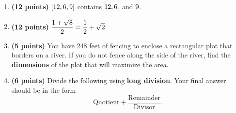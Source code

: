 \documentclass[12pt]{amsart}
\begin{document}
\begin{enumerate}
\item {\bf (12 points)} 
 $\setthreetwo$ contains $\athreetwo,\bthreetwo$, and $\cthreetwo$. 
\vfill 
\def \a{7}\def \atwoone{1}\def \atwotwo{-2}\def \atwothree{2}\def \btwothree{8}\def \sumtwothree{10}\def \diftwothree{-6}\def \bigtwothree{200}\def \powtwothree{64}\def \logtwothree{0.33333333333333337}\def \factortwothree{119}\def \atwofour{1.98}\def \btwofour{1.852}\def \tooshorttwofour{10.1}\def \moneytwofour{10.10}\def \longertwofour{10.10000}\def \atwofive{0.12}\def \btwofive{0.12346}\def \athreeone{6}\def \bthreeone{4}\def \setthreetwo{[12, 6, 9]}\def \athreetwo{12}\def \bthreetwo{6}\def \cthreetwo{9}\def \controlthreethree{-5}\def \athreethree{1}\def \topthreethree{1}\def \athreefour{5}\def \bthreefour{4}\def \listthreefour{[1, 2, 3, 4]}\def \afourone{4}\def \bfourone{-2}\def \fracfourone{-2}\def \rootfourtwo{8}\def \simplifiedfourtwo{2 \sqrt{2}}\def \sqrtlistfourtwo{[2, 2]}\def \outfourtwo{2}\def \infourtwo{2}\def \wowfourtwo{1}\def \afourthree{5}\def \nicethreefour{3x^{2}-x^{}+5}\def \nastythreefour{xyz^{3}+5}\def \cfourthree{4}\def \dfourthree{-10}\def \infourthree{4x^{}}\def \outfourthree{-10y^{}}\def \afourfour{1842471}\def \nicefourfour{1,842,471}\def \goodfourfour{1,000,000.12345}\def \badfourfour{1,000,000.1}
\item {\bf (12 points)} 
 $\dfrac{1+\sqrt{\rootfourtwo}}{2} = \dfrac{1}{2} + \ifthenelse{\wowfourtwo = 1}{}{\wowfourtwo} \sqrt{\infourtwo}$

\vfill 
\newpage\def \x{62}\def \y{124}\def \L{248}\def \area{7688}
\item {\bf (5 points)} 
 You have $\L$ feet of fencing to enclose a rectangular plot that borders on a river. If you do not fence along the side of the river, find the \textbf{dimensions} of the plot that will maximize the area. \\

  
\vfill \vfill \vfill
\def \a{5}\def \b{3}\def \c{-8}\def \r{8}\def \monicpol{x^{}+5}\def \longnbad{3x^{2}+7x^{}-32}\def \anspol{3x^{}-8}
\item {\bf (6 points)} 
 Divide the following using {\bf long division}. Your final answer should be in the form $$ \text{Quotient} + \dfrac{\text{Remainder}}{\text{Divisor}}.$$


\end{enumerate}
\end{document}
